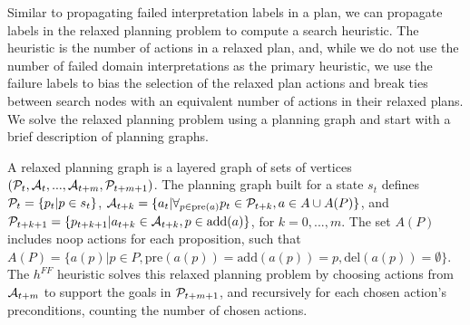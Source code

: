 \documentclass{article}
\def\citep#1{\cite{#1}} \def\citet#1{\citeA{#1}}
\def\und#1{\noindent{\bf #1}:}
\def\und#1{\medskip{\noindent\bf #1:}}
\begin{document}
Similar to propagating failed interpretation labels in a plan, we can propagate
labels in the relaxed planning problem to compute a search heuristic.  The
heuristic is the number of actions in a relaxed plan, and, while we do not use
the number of failed domain interpretations as the primary heuristic, we use the
failure labels to bias the selection of the relaxed plan actions and break ties
between search nodes with an equivalent number of actions in their relaxed
plans.  We solve the relaxed planning problem using a planning graph and 
start with a brief description of planning graphs.

\und{Planning Graph Heuristics}   A relaxed planning graph  is a layered graph of sets of vertices $({\cal P}_t, {\cal A}_t, ..., {\cal A}_{t+m}, {\cal P}_{t+m+1})$.  The planning graph built for a state $s_t$ defines ${\cal P}_t = \{p_t | p \in s_t\}$, ${\cal A}_{t+k} = \{ a_t | \forall_{ p \in \text{pre}(a)} p_t \in {\cal P}_{t+k}, a \in A \cup A(P)\}$, and ${\cal P}_{t+k+1} = \{p_{t+k+1} | a_{t+k} \in {\cal A}_{t+k}, p \in \text{add}(a)\}$, for $k = 0, ..., m$.  The set $A(P)$ includes noop actions for each proposition, such that $A(P) = \{a(p) | p \in P, \text{pre}(a(p)) =\text{add}(a(p))=p, \text{del}(a(p))=\emptyset\}$.
The $h^{FF}$  heuristic \citep{hoffmann:nebel:jair-01} solves this relaxed planning problem by choosing actions from ${\cal A}_{t+m}$ to support the goals in ${\cal P}_{t+m+1}$, and recursively for each chosen action's preconditions, counting the number of chosen actions.

 
\end{document}
